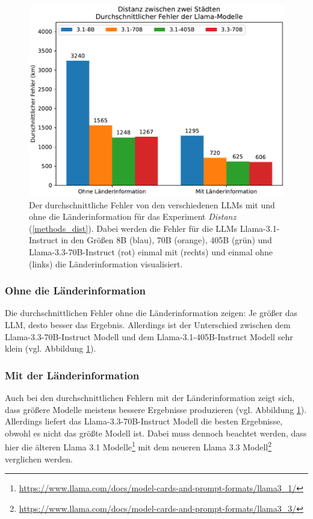 \begin{figure}[tb] %
    \centering
    \includegraphics[width=0.7\columnwidth]{img/distance_error.pdf}
    
    \caption{
        Der durchschnittliche Fehler von den verschiedenen LLMs mit und ohne die Länderinformation für das Experiment \textit{Distanz} (\ref{methods_dist}).
        Dabei werden die Fehler für die LLMs Llama-3.1-Instruct in den Größen 8B (blau), 70B (orange), 405B (grün) und Llama-3.3-70B-Instruct (rot) einmal mit (rechts) und einmal ohne (links) die Länderinformation visualisiert.
    }

    \label{fig_dist_error}
\end{figure}

\subsubsection*{Ohne die Länderinformation}
Die durchschnittlichen Fehler ohne die Länderinformation zeigen: Je größer das LLM, desto besser das Ergebnis.
Allerdings ist der Unterschied zwischen dem Llama-3.3-70B-Instruct Modell und dem Llama-3.1-405B-Instruct Modell sehr klein (vgl. Abbildung \ref{fig_dist_error}).

\subsubsection*{Mit der Länderinformation}
Auch bei den durchschnittlichen Fehlern mit der Länderinformation zeigt sich, dass größere Modelle meistens bessere Ergebnisse produzieren (vgl. Abbildung \ref{fig_dist_error}).
Allerdings liefert das Llama-3.3-70B-Instruct Modell die besten Ergebnisse, obwohl es nicht das größte Modell ist.
Dabei muss dennoch beachtet werden, dass hier die älteren Llama 3.1 Modelle\footnote{\url{https://www.llama.com/docs/model-cards-and-prompt-formats/llama3_1/}} mit dem neueren Llama 3.3 Modell\footnote{\url{https://www.llama.com/docs/model-cards-and-prompt-formats/llama3_3/}} verglichen werden.

